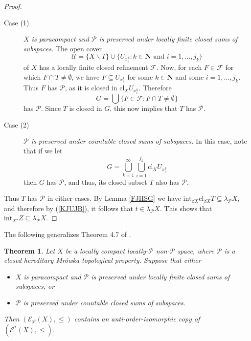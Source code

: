 \documentclass{amsart}
\newtheorem{theorem}{Theorem}[section]
\theoremstyle{definition}
\theoremstyle{remark}
\theoremstyle{notation}
\numberwithin{equation}{section}
\begin{document}
\begin{proof}
\begin{description}
\item[{\sc Case (1)}] {\em $X$ is paracompact and ${\mathcal P}$ is preserved under locally finite closed sums of subspaces.} The open cover
\[{\mathscr U}=\{X\backslash T\}\cup\{U_{x_i^k}:k\in {\mathbf N}\mbox{ and }i=1,\ldots,j_k\}\]
of $X$ has a locally finite closed refinement ${\mathscr F}$. Now, for each $F\in {\mathscr F}$ for which  $F\cap T\neq\emptyset$, we have
$F\subseteq U_{x_i^k}$ for some $k\in {\mathbf N}$  and some $i=1,\ldots,j_k$. Thus $F$ has ${\mathcal P}$, as it is closed in $\mbox{cl}_XU_{x_i^k}$. Therefore
\[G=\bigcup\{F\in {\mathscr F}:F\cap T\neq\emptyset\}\]
has  ${\mathcal P}$. Since $T$ is  closed in $G$, this now implies that $T$ has ${\mathcal P}$.
\item[{\sc Case (2)}] {\em ${\mathcal P}$ is preserved under countable closed sums of subspaces.} In this case, note that if we let \[G=\bigcup_{k=1}^{\infty}\bigcup_{i=1}^{j_k}\mbox{cl}_XU_{x_i^k}\]
then $G$ has ${\mathcal P}$, and thus, its closed subset $T$ also has ${\mathcal P}$.
\end{description}
Thus $T$ has ${\mathcal P}$ in either cases. By Lemma \ref{FJHSG}  we have $\mbox{int}_{\beta X}\mbox{cl}_{\beta X}T\subseteq\lambda_{{\mathcal P}} X$, and therefore by (\ref{KJUJB}), it follows that $t\in \lambda_{{\mathcal P}} X$. This shows that $\mbox{int}_{X^\star}Z\subseteq\lambda_{{\mathcal P}} X$.
\end{proof}

The following  generalizes Theorem 4.7 of  \cite{Ko2}.

\begin{theorem}\label{JHDSB}
Let $X$ be a locally compact locally-${\mathcal P}$ non-${\mathcal P}$  space, where ${\mathcal P}$ is a  closed hereditary Mr\'{o}wka topological property. Suppose that either
\begin{itemize}
\item[\rm(1)] $X$ is paracompact and ${\mathcal P}$ is preserved under locally finite closed sums of subspaces, or
\item[\rm(2)] ${\mathcal P}$ is preserved under countable closed sums of subspaces.
\end{itemize}
Then $({\mathscr E}_{{\mathcal P}}(X),\leq)$ contains an anti-order-isomorphic copy  of  $({\mathscr E}^*(X),\leq)$.
\end{theorem}
\end{document}
